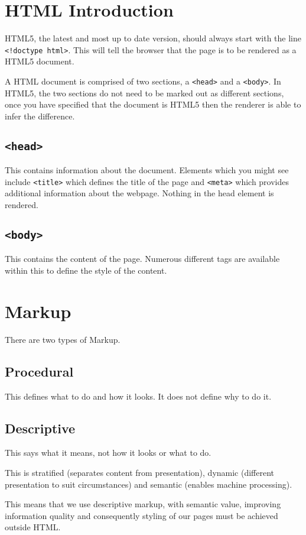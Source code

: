 \section*{HTML Introduction}
HTML5, the latest and most up to date version, should always start with the line \texttt{<!doctype html>}. This will tell the browser that the page is to be rendered as a HTML5 document.

A HTML document is comprised of two sections, a \texttt{<head>} and a \texttt{<body>}. In HTML5, the two sections do not need to be marked out as different sections, once you have specified that the document is HTML5 then the renderer is able to infer the difference.
\subsection*{\texttt{<head>}}
This contains information about the document. Elements which you might see include \texttt{<title>} which defines the title of the page and \texttt{<meta>} which provides additional information about the webpage. Nothing in the head element is rendered.

\subsection*{\texttt{<body>}}
This contains the content of the page. Numerous different tags are available within this to define the style of the content.

\section*{Markup}
There are two types of Markup.
\subsection*{Procedural}
This defines what to do and how it looks. It does not define why to do it.
\subsection*{Descriptive}
This says what it means, not how it looks or what to do.

This is stratified (separates content from presentation), dynamic (different presentation to suit circumstances) and semantic (enables machine processing).

This means that we use descriptive markup, with semantic value, improving information quality and consequently styling of our pages must be achieved outside HTML.